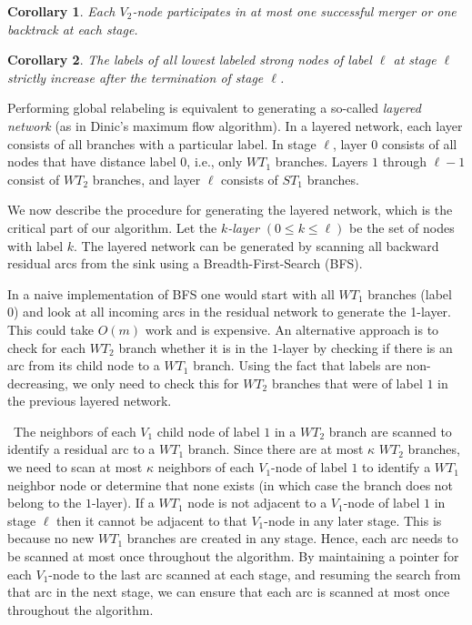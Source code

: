 \documentclass{article}
\newtheorem{corollary}{Corollary}[section]
\begin{document}
\begin{corollary}
\label{cor:nodethroughput}
Each $V_2$-node participates in at most one successful merger or one backtrack at each stage.
\end{corollary}

\begin{corollary}
\label{lem:increasinglabel}
The labels of all lowest labeled strong nodes of label $\ell$ at stage $\ell$ strictly increase after the termination of stage $\ell$.
\end{corollary}

Performing global relabeling is equivalent to generating a so-called {\em layered network} (as in Dinic's maximum flow algorithm). In a layered network, each layer consists of all branches with a particular label. In stage $\ell$, layer $0$ consists of all nodes that have distance label $0$, i.e., only $WT_1$ branches.  Layers $1$ through $\ell-1$ consist of $WT_2$ branches, and layer $\ell$ consists of $ST_1$ branches.

We now describe the procedure for generating the layered network, which is the critical part of our algorithm.  Let the {\em $k$-layer} $(0 \leq k \leq \ell)$ be the set of nodes with label $k$.  The layered network can be generated by scanning all backward residual arcs from the sink using a Breadth-First-Search (BFS).

In a naive implementation of BFS one would start with all $WT_1$ branches (label 0) and look at all incoming arcs in the residual network to generate the 1-layer. This could take $O(m)$ work and is expensive.   An alternative approach is to check for each $WT_2$ branch whether it is in the $1$-layer by checking if there is an arc from its child node to a $WT_1$ branch. Using the fact that labels are non-decreasing, we only need to check this for $WT_2$ branches that were of label $1$ in the previous layered network. \medskip

~The neighbors of each $V_1$ child node of label $1$ in a $WT_2$ branch are scanned to identify a residual arc to a $WT_1$ branch. Since there are at most $\kappa$ $WT_2$ branches, we need to scan at most $\kappa$ neighbors of each $V_1$-node of label $1$ to identify a $WT_1$ neighbor node or determine that none exists (in which case the branch does not belong to the $1$-layer). If a $WT_1$ node is not adjacent to a $V_1$-node of label $1$ in stage $\ell$ then it cannot be adjacent to that $V_1$-node in any later stage.  This is because no new $WT_1$ branches are created in any stage.  Hence, each arc needs to be scanned at most once throughout the algorithm. By maintaining a pointer for each $V_1$-node to the last arc scanned at each stage, and resuming the search from that arc in the next stage, we can ensure that each arc is scanned at most once throughout the algorithm.
\end{document}
